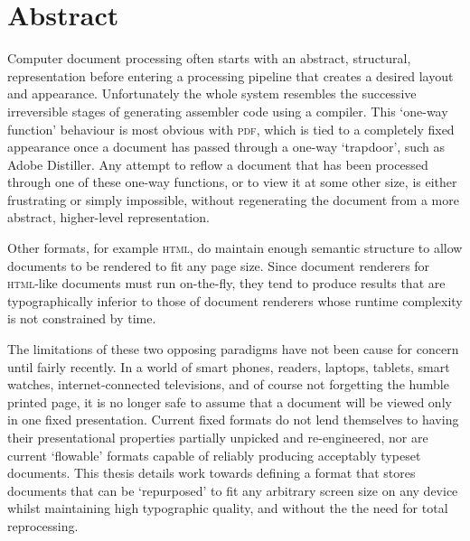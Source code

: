 \cleardoublepage
\begingroup
\let\clearpage\relax
\let\cleardoublepage\relax
\let\cleardoublepage\relax

\chapter*{Abstract}
Computer document processing often starts with an abstract, structural, representation before entering a processing pipeline that creates a desired layout and appearance. Unfortunately the whole system resembles the successive irreversible stages of generating assembler code using a compiler. This `one-way function' behaviour is most obvious with \textsc{pdf}, which is tied to a completely fixed appearance once a document has passed through a one-way `trapdoor', such as Adobe Distiller. Any attempt to reflow a document that has been processed through one of these one-way functions, or to view it at some other size, is either frustrating or simply impossible, without regenerating the document from a more abstract, higher-level representation.

Other formats, for example \textsc{html}, do maintain enough semantic structure to allow documents to be rendered to fit any page size. Since document renderers for \textsc{html}-like documents must run on-the-fly, they tend to produce results that are typographically inferior to those of document renderers whose runtime complexity is not constrained by time.

The limitations of these two opposing paradigms have not been cause for concern until fairly recently. In a world of smart phones, \ebook{} readers, laptops, tablets, smart watches, internet-connected televisions, and of course not forgetting the humble printed page, it is no longer safe to assume that a document will be viewed only in one fixed presentation. Current fixed formats do not lend themselves to having their presentational properties partially unpicked and re-engineered, nor are current `flowable' formats capable of reliably producing acceptably typeset documents. This thesis details work towards defining a format that stores documents that can be `repurposed' to fit any arbitrary screen size on any device whilst maintaining high typographic quality, and without the the need for total reprocessing.

\endgroup

\vfill